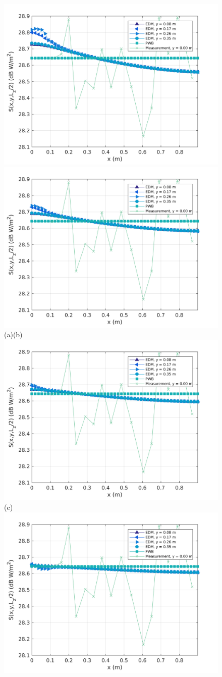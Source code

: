 \documentclass[a4paper]{article}
\numberwithin{equation}{section}
\begin{document}
\begin{figure}[hp]
\begin{center}
\includegraphics[width=0.49\linewidth]{figures/SDM_3D_SU_PowerDensityProfileXMeas_JX_k0_5}
\includegraphics[width=0.49\linewidth]{figures/SDM_3D_SU_PowerDensityProfileXMeas_JX_k0_75}\\
{\footnotesize (a)\hspace{75mm}(b)}\\
\includegraphics[width=0.5\linewidth]{figures/SDM_3D_SU_PowerDensityProfileXMeas_JX_k1_0}\\
{\footnotesize (c)}\\
\includegraphics[width=0.49\linewidth]{figures/SDM_3D_SU_PowerDensityProfileXMeas_JX_k1_5}

\end{center}
\end{figure}
\end{document}
